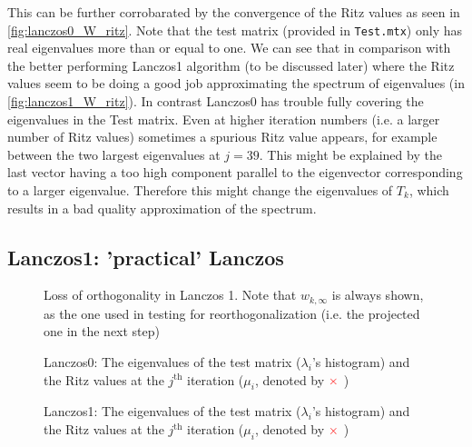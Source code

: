 \documentclass{article}
\begin{document}
	This can be further corrobarated by the convergence of the Ritz values as seen in \autoref{fig:lanczos0_W_ritz}. Note that the test matrix (provided in \texttt{Test.mtx}) only has real eigenvalues more than or equal to one. We can see that in 
	comparison with the better performing Lanczos1 algorithm (to be discussed later) where the Ritz values seem to be doing a good job approximating the spectrum of eigenvalues (in \autoref{fig:lanczos1_W_ritz}). In contrast Lanczos0 has trouble fully covering the eigenvalues in the Test matrix. Even at higher iteration numbers (i.e. a larger number of Ritz values) sometimes a spurious Ritz value appears, for example between the two largest eigenvalues at $j=39$. This might be explained by the last vector having a too high component parallel to the eigenvector corresponding to a larger eigenvalue. Therefore this might change the eigenvalues of $T_k$, which results in a bad quality approximation of the spectrum.
	
	
	
	\subsection{Lanczos1: 'practical' Lanczos}
	
	
	
	\begin{figure}
		\centering
		\resizebox{\textwidth}{!}{
			}
		\caption{Loss of orthogonality in Lanczos 1. Note that $w_{k,\infty}$ is always shown, as the one used in testing for reorthogonalization (i.e. the projected one in the next step)}\label{fig:lanczos1_W}
	\end{figure}
	
	\begin{figure}
	\centering
	\caption{Lanczos0: The eigenvalues of the test matrix ($\lambda_i$'s histogram) and the Ritz values at the $j^{\mathrm{th}}$ iteration ($\mu_i$, denoted by ${\color{red} \times}$ )}\label{fig:lanczos0_W_ritz}
	\end{figure}
	
	\begin{figure}
	\centering
	\caption{Lanczos1: The eigenvalues of the test matrix ($\lambda_i$'s histogram) and the Ritz values at the $j^{\mathrm{th}}$ iteration ($\mu_i$, denoted by ${\color{red} \times}$ )}\label{fig:lanczos1_W_ritz}
	\end{figure}
	
\end{document}
